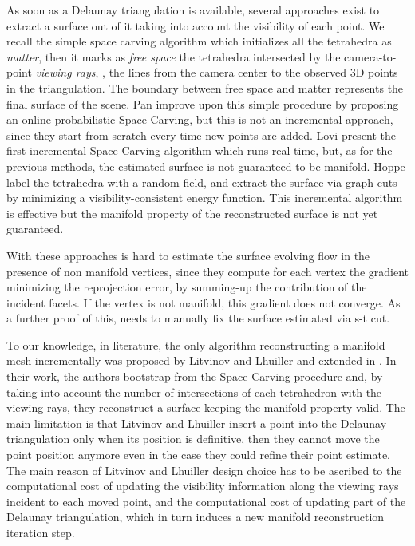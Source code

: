 As soon as a Delaunay triangulation is available, several approaches exist to extract a surface out of it taking into account the visibility of each point. 
We recall the simple space carving algorithm \cite{kutulakos_seitz05} which initializes all the tetrahedra as \emph{matter}, then it marks as \emph{free space} the tetrahedra intersected by the camera-to-point \emph{viewing rays}, \ie, the lines from the camera center to the observed 3D points in the triangulation. 
The boundary between free space and matter represents the final surface of the scene.
Pan \etal \cite{Pan_et_al09} improve upon this simple procedure by proposing an online probabilistic Space Carving, but this is not an incremental approach, since they start from scratch every time new points are added.
Lovi \etal \cite{lovi_et_al_11} present the first incremental Space Carving algorithm which runs real-time, but, as for the previous methods, the estimated surface is not guaranteed to be manifold.
 Hoppe \etal \cite{Hoppe13} label the tetrahedra with a random field, and extract the surface via graph-cuts by minimizing a visibility-consistent energy function. This incremental algorithm is effective but the manifold property of the reconstructed surface is not yet guaranteed.


With these approaches is hard to estimate the surface evolving flow in the presence of non manifold vertices, since they compute for each vertex the gradient minimizing the reprojection error, by summing-up the contribution of the incident facets. If the vertex is not manifold, this gradient does not converge. As a further proof of this, \cite{vu_et_al_2012} needs to manually fix the surface estimated via s-t cut.

To our knowledge, in literature, the only algorithm reconstructing a manifold mesh incrementally was proposed by Litvinov and Lhuiller \cite{litvinov_lhuillier_13,litvinov_Lhiuller14} and extended in \cite{romanoni15a,romanoni15b}. 
In their work, the authors  bootstrap from the Space Carving procedure and, by taking into account the number of intersections of each tetrahedron with the viewing rays, they reconstruct a surface keeping the manifold property valid. 
The main limitation is that  Litvinov and Lhuiller insert a point into the Delaunay triangulation only when its position is definitive, then they cannot move the point position anymore even in the case they could refine their point  estimate. 
The main reason of Litvinov and Lhuiller design choice has to be ascribed to the computational cost of updating the visibility information along the viewing rays incident to each moved point, and the computational cost of updating part of the Delaunay triangulation, which in turn induces a new manifold reconstruction iteration step.

